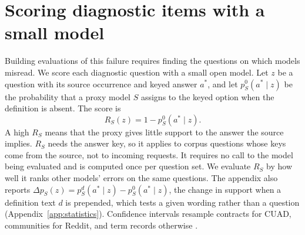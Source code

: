 \section{Scoring diagnostic items with a small model}
\label{sec:index}
Building evaluations of this failure requires finding the questions on which models misread. We score each diagnostic question with a small open model. Let $z$ be a question with its source occurrence and keyed answer $a^*$, and let $p_S^0(a^*\mid z)$ be the probability that a proxy model $S$ assigns to the keyed option when the definition is absent. The score is
\begin{equation}
R_S(z)=1-p_S^0(a^*\mid z).
\label{eq:risk}
\end{equation}
A high $R_S$ means that the proxy gives little support to the answer the source implies. $R_S$ needs the answer key, so it applies to corpus questions whose keys come from the source, not to incoming requests. It requires no call to the model being evaluated and is computed once per question set. We evaluate $R_S$ by how well it ranks other models' errors on the same questions. The appendix also reports $\Delta p_S(z)=p_S^d(a^*\mid z)-p_S^0(a^*\mid z)$, the change in support when a definition text $d$ is prepended, which tests a given wording rather than a question (Appendix~\ref{app:statistics}). Confidence intervals resample contracts for CUAD, communities for Reddit, and term records otherwise \citep{significance}.
